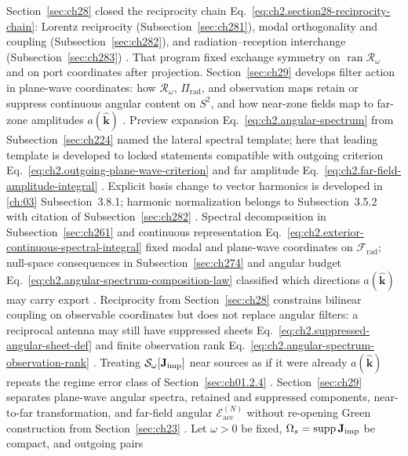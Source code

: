 Section~\ref{sec:ch28} closed the reciprocity chain
Eq.~\eqref{eq:ch2.section28-reciprocity-chain}: Lorentz reciprocity (Subsection~\ref{sec:ch281}),
modal orthogonality and coupling (Subsection~\ref{sec:ch282}), and radiation--reception
interchange (Subsection~\ref{sec:ch283}) \cite{stratton1941}. That program fixed exchange
symmetry on \(\operatorname{ran}\mathcal{R}_\omega\) and on port coordinates after projection.
Section~\ref{sec:ch29} develops filter action in plane-wave coordinates: how
\(\mathcal{R}_\omega\), \(\Pi_{\mathrm{rad}}\), and observation maps retain or suppress
continuous angular content on \(S^{2}\), and how near-zone fields map to far-zone amplitudes
\(a(\widehat{\mathbf{k}})\) \cite{stratton1941}. Preview expansion
Eq.~\eqref{eq:ch2.angular-spectrum} from Subsection~\ref{sec:ch224} named the lateral
spectral template; here that leading template is developed to locked statements compatible with outgoing
criterion Eq.~\eqref{eq:ch2.outgoing-plane-wave-criterion} and far amplitude
Eq.~\eqref{eq:ch2.far-field-amplitude-integral} \cite{stratton1941}. Explicit basis change to
vector harmonics is developed in \ref{ch:03} Subsection~3.8.1; harmonic normalization belongs to
Subsection~3.5.2 with citation of Subsection~\ref{sec:ch282} \cite{harrington2001}.
Spectral decomposition in Subsection~\ref{sec:ch261} and continuous representation
Eq.~\eqref{eq:ch2.exterior-continuous-spectral-integral} fixed modal and plane-wave coordinates
on \(\mathcal{F}_{\mathrm{rad}}\); null-space consequences in Subsection~\ref{sec:ch274} and
angular budget Eq.~\eqref{eq:ch2.angular-spectrum-composition-law} classified which directions
\(a(\widehat{\mathbf{k}})\) may carry export \cite{stratton1941}. Reciprocity from
Section~\ref{sec:ch28} constrains bilinear coupling on observable coordinates but does not
replace angular filters: a reciprocal antenna may still have suppressed sheets
Eq.~\eqref{eq:ch2.suppressed-angular-sheet-def} and finite observation rank
Eq.~\eqref{eq:ch2.angular-spectrum-observation-rank} \cite{stratton1941}. Treating
\(\mathcal{S}_\omega[\mathbf{J}_{\mathrm{imp}}]\) near sources as if it were already \(a(\widehat{\mathbf{k}})\)
repeats the regime error class of Section~\ref{sec:ch01.2.4} \cite{stratton1941}.
Section~\ref{sec:ch29} separates plane-wave angular spectra, retained and suppressed
components, near-to-far transformation, and far-field angular $\mathcal{E}_{\mathrm{acc}}^{(N)}$ without re-opening
Green construction from Section~\ref{sec:ch23} \cite{stratton1941}.
Let \(\omega>0\) be fixed, \(\Omega_s=\operatorname{supp}\mathbf{J}_{\mathrm{imp}}\) be compact, and outgoing pairs
